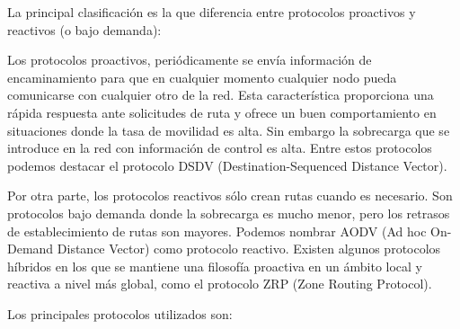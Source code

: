 La principal clasificaci\'on es la que diferencia entre protocolos proactivos y reactivos (o bajo demanda): 

Los protocolos proactivos, peri\'odicamente se env\'ia informaci\'on de encaminamiento para que en cualquier momento cualquier nodo pueda comunicarse con cualquier otro de la red. Esta caracter\'istica proporciona una r\'apida respuesta ante solicitudes de ruta y ofrece un buen comportamiento en situaciones donde la tasa de movilidad es alta. Sin embargo la sobrecarga que se introduce en la red con informaci\'on de control es alta. Entre estos protocolos podemos destacar el protocolo DSDV (Destination-Sequenced Distance Vector).

Por otra parte, los protocolos reactivos s\'olo crean rutas cuando es necesario. Son protocolos bajo demanda donde la sobrecarga es mucho menor, pero los retrasos de establecimiento de rutas son mayores. Podemos nombrar AODV (Ad hoc On-Demand Distance Vector) como protocolo reactivo. Existen algunos protocolos h\'ibridos en los que se mantiene una filosof\'ia proactiva en un \'ambito local y reactiva a nivel m\'as global, como el protocolo ZRP (Zone Routing Protocol).

Los principales protocolos utilizados son:

